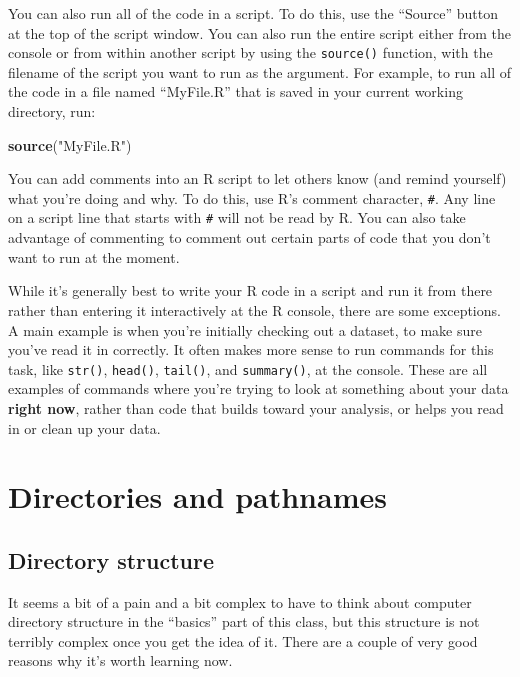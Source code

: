 \documentclass[]{book}
\makeatletter
\newenvironment{Shaded}{\begin{snugshade}}{\end{snugshade}}
\newcommand{\KeywordTok}[1]{\textcolor[rgb]{0.13,0.29,0.53}{\textbf{#1}}}
\newcommand{\StringTok}[1]{\textcolor[rgb]{0.31,0.60,0.02}{#1}}
\newcommand{\NormalTok}[1]{#1}
\newenvironment{kframe}{%
\medskip{}
\setlength{\fboxsep}{.8em}
 \def\at@end@of@kframe{}%
 \ifinner\ifhmode%
  \def\at@end@of@kframe{\end{minipage}}%
  \begin{minipage}{\columnwidth}%
 \fi\fi%
 \def\FrameCommand##1{\hskip\@totalleftmargin \hskip-\fboxsep
 \colorbox{shadecolor}{##1}\hskip-\fboxsep
     \hskip-\linewidth \hskip-\@totalleftmargin \hskip\columnwidth}%
 \MakeFramed {\advance\hsize-\width
   \@totalleftmargin\z@ \linewidth\hsize
   \@setminipage}}%
 {\par\unskip\endMakeFramed%
 \at@end@of@kframe}
\renewenvironment{Shaded}{\begin{kframe}}{\end{kframe}}
\theoremstyle{definition}
\theoremstyle{definition}
\theoremstyle{definition}
\theoremstyle{remark}
\makeatother
\begin{document}
You can also run all of the code in a script. To do this, use the
``Source'' button at the top of the script window. You can also run the
entire script either from the console or from within another script by
using the \texttt{source()} function, with the filename of the script
you want to run as the argument. For example, to run all of the code in
a file named ``MyFile.R'' that is saved in your current working
directory, run:

\begin{Shaded}
\begin{Highlighting}[]
\KeywordTok{source}\NormalTok{(}\StringTok{"MyFile.R"}\NormalTok{)}
\end{Highlighting}
\end{Shaded}

You can add comments into an R script to let others know (and remind
yourself) what you're doing and why. To do this, use R's comment
character, \texttt{\#}. Any line on a script line that starts with
\texttt{\#} will not be read by R. You can also take advantage of
commenting to comment out certain parts of code that you don't want to
run at the moment.

While it's generally best to write your R code in a script and run it
from there rather than entering it interactively at the R console, there
are some exceptions. A main example is when you're initially checking
out a dataset, to make sure you've read it in correctly. It often makes
more sense to run commands for this task, like \texttt{str()},
\texttt{head()}, \texttt{tail()}, and \texttt{summary()}, at the
console. These are all examples of commands where you're trying to look
at something about your data \textbf{right now}, rather than code that
builds toward your analysis, or helps you read in or clean up your data.

\section{Directories and pathnames}\label{directories-and-pathnames}

\subsection{Directory structure}\label{directory-structure}

It seems a bit of a pain and a bit complex to have to think about
computer directory structure in the ``basics'' part of this class, but
this structure is not terribly complex once you get the idea of it.
There are a couple of very good reasons why it's worth learning now.
\end{document}
